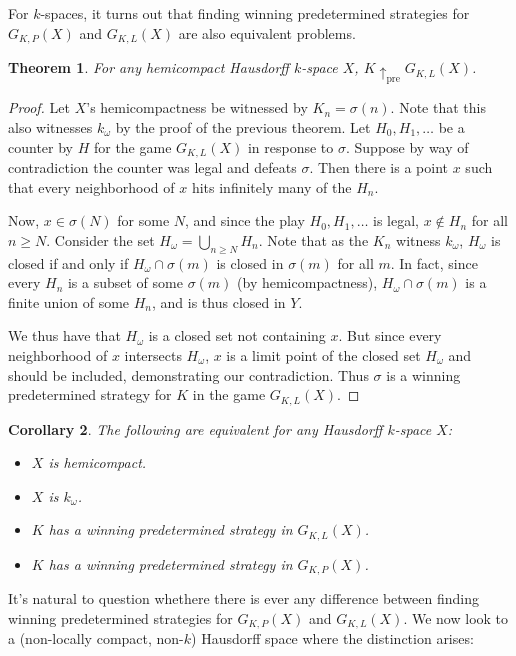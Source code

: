 \documentclass[11pt]{article}
\theoremstyle{plain}
\newtheorem{theorem}{Theorem}
\newtheorem{corollary}[theorem]{Corollary}
\theoremstyle{definition}
\theoremstyle{remark}
\newcommand{\prewin}{\uparrow_{\text{pre}}}
\begin{document}
For $k$-spaces, it turns out that finding winning predetermined strategies for $G_{K,P}(X)$ and $G_{K,L}(X)$ are also equivalent problems.

\begin{theorem}
For any hemicompact Hausdorff $k$-space $X$, $K \prewin G_{K,L}(X)$.
\end{theorem}

\begin{proof}
Let $X$'s hemicompactness be witnessed by $K_n=\sigma(n)$. Note that this also witnesses $k_\omega$ by the proof of the previous theorem. Let $H_0,H_1,\dots$ be a counter by $H$ for the game $G_{K,L}(X)$ in response to $\sigma$. Suppose by way of contradiction the counter was legal and defeats $\sigma$. Then there is a point $x$ such that every neighborhood of $x$ hits infinitely many of the $H_n$.

Now, $x\in\sigma(N)$ for some $N$, and since the play $H_0,H_1,\dots$ is legal, $x\not\in H_n$ for all $n\geq N$. Consider the set $H_\omega=\bigcup_{n\geq N} H_n$. Note that as the $K_n$ witness $k_\omega$, $H_\omega$ is closed if and only if $H_\omega \cap \sigma(m)$ is closed in $\sigma(m)$ for all $m$. In fact, since every $H_n$ is a subset of some $\sigma(m)$ (by hemicompactness), $H_\omega \cap \sigma(m)$ is a finite union of some $H_n$, and is thus closed in $Y$.

We thus have that $H_\omega$ is a closed set not containing $x$. But since every neighborhood of $x$ intersects $H_\omega$, $x$ is a limit point of the closed set $H_\omega$ and should be included, demonstrating our contradiction. Thus $\sigma$ is a winning predetermined strategy for $K$ in the game $G_{K,L}(X)$.
\end{proof}

\begin{corollary}
The following are equivalent for any Hausdorff $k$-space $X$:
  \begin{itemize}
  \item $X$ is hemicompact.
  \item $X$ is $k_{\omega}$.
  \item $K$ has a winning predetermined strategy in $G_{K,L}(X)$.
  \item $K$ has a winning predetermined strategy in $G_{K,P}(X)$.
  \end{itemize}
\end{corollary}

It's natural to question whethere there is ever any difference between finding winning predetermined strategies for $G_{K,P}(X)$ and $G_{K,L}(X)$. We now look to a (non-locally compact, non-$k$) Hausdorff space where the distinction arises:
\end{document}
